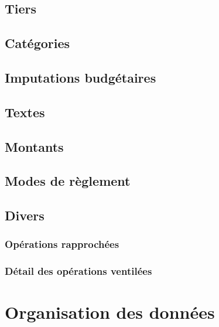 \subsection{Tiers\label{reportscreation-selection-thirdparties}}


\subsection{Catégories\label{reportscreation-selection-categories}}


\subsection{Imputations budgétaires\label{reportscreation-selection-budgetarylines}}


\subsection{Textes\label{reportscreation-selection-text}}


\subsection{Montants\label{reportscreation-selection-amount}}

\subsection{Modes de règlement\label{reportscreation-selection-paiementmode}}


\subsection{Divers\label{reportscreation-selection-misc}}

\subsubsection{Opérations rapprochées}

\subsubsection{Détail des opérations ventilées}

\section{Organisation des données\label{reportscreation-organisation}}


